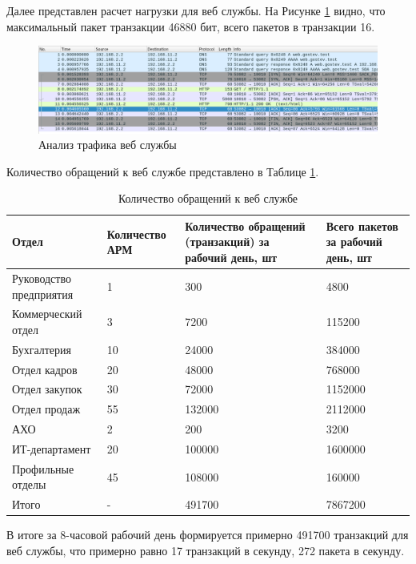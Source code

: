 \documentclass[14pt, a4paper]{extarticle}
\numberwithin{equation}{section}
\begin{document}
Далее представлен расчет нагрузки для веб службы. На Рисунке 
\ref{fig:wireshark_web_dump} видно, что максимальный
пакет транзакции 46880 бит, всего пакетов в транзакции 16. 
\begin{figure}[H]
        \centering
        \includegraphics[scale=0.6]{web_wireshark.png}
        \caption{Анализ трафика веб службы}
        \label{fig:wireshark_web_dump}
\end{figure}



Количество обращений к веб службе представлено в Таблице \ref{table:web_requests}.

\begin{table}[H]
\centering
\small
\caption{Количество обращений к веб службе}
\label{table:web_requests}
\begin{tabular}{|m{3cm}|m{3cm}|m{4cm}|m{3cm}|}
\hline
\textbf{Отдел} & \textbf{Количество АРМ} & \textbf{Количество обращений (транзакций) за рабочий день, шт } & \textbf{Всего пакетов за рабочий день, шт }\\
\hline
Руководство предприятия & 1 & 300 & 4800 \\
\hline
Коммерческий отдел & 3 & 7200 & 115200 \\
\hline
Бухгалтерия & 10 & 24000 & 384000 \\
\hline
Отдел кадров & 20 & 48000 & 768000 \\
\hline
Отдел закупок & 30 & 72000 & 1152000\\
\hline
Отдел продаж & 55 & 132000 & 2112000 \\
\hline
АХО & 2 & 200 & 3200 \\
\hline
ИТ-департамент & 20 & 100000 & 1600000 \\
\hline
Профильные отделы & 45 & 108000 & 160000 \\
\hline
Итого & - & 491700  &  7867200 \\
\hline
\end{tabular}
\end{table}

В итоге за 8-часовой рабочий день формируется примерно 491700 транзакций для 
веб службы, что примерно равно 
17 транзакций в секунду, 272 пакета в секунду.
\end{document}
